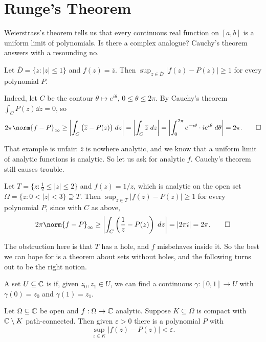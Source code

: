 \documentclass[a4paper]{scrartcl}
\newcommand{\dbar}{\overline{D}}
\begin{document}
\section{Runge's Theorem}

Weierstrass's theorem tells us that every continuous real function on $[a,b]$ is a uniform limit of polynomials. Is there a complex analogue? Cauchy's theorem answers with a resounding no.

\begin{example}\label{ex:zbar}
	Let $\dbar = \{z : |z|\leq1\}$ and $f(z) = \overline z$. Then $\sup_{z\in\dbar}|f(z)-P(z)|\geq1$ for every polynomial $P$.

	Indeed, let $C$ be the contour $\theta\mapsto e^{i\theta}$, $0\leq\theta\leq2\pi$. By Cauchy's theorem $\int_C P(z)\dd z = 0$, so
	$$2\pi\norm{f-P}_\infty \geq \left|\int_C\big(\overline z - P(z)\big)\dd z\right| = \left|\int_C\overline z\dd z\right| = \left|\int_0^{2\pi}e^{-i\theta}\cdot ie^{i\theta}\dd\theta\right| = 2\pi. \qedhere$$
\end{example}

That example is unfair: $\overline z$ is nowhere analytic, and we know that a uniform limit of analytic functions is analytic. So let us ask for analytic $f$. Cauchy's theorem still causes trouble.

\begin{example}\label{ex:oneoverz}
	Let $T = \{z : \tfrac12\leq|z|\leq2\}$ and $f(z) = 1/z$, which is analytic on the open set $\Omega = \{z : 0<|z|<3\}\supseteq T$. Then $\sup_{z\in T}|f(z)-P(z)|\geq1$ for every polynomial $P$, since with $C$ as above,
	$$2\pi\norm{f-P}_\infty\geq\left|\int_C\left(\frac1z - P(z)\right)\dd z\right| = |2\pi i| = 2\pi. \qedhere$$
\end{example}

The obstruction here is that $T$ has a hole, and $f$ misbehaves inside it. So the best we can hope for is a theorem about sets without holes, and the following turns out to be the right notion.

\begin{definition}
	A set $U\subseteq\mathbb{C}$ is  if, given $z_0,z_1\in U$, we can find a continuous $\gamma : [0,1]\to U$ with $\gamma(0)=z_0$ and $\gamma(1)=z_1$.
\end{definition}

\begin{theorem}[Runge]\label{thm:runge}
	Let $\Omega\subseteq\mathbb{C}$ be open and $f : \Omega\to\mathbb{C}$ analytic. Suppose $K\subseteq\Omega$ is compact with $\mathbb{C}\setminus K$ path-connected. Then given $\varepsilon>0$ there is a polynomial $P$ with
	$$\sup_{z\in K}|f(z)-P(z)|<\varepsilon.$$
\end{theorem}
\end{document}
